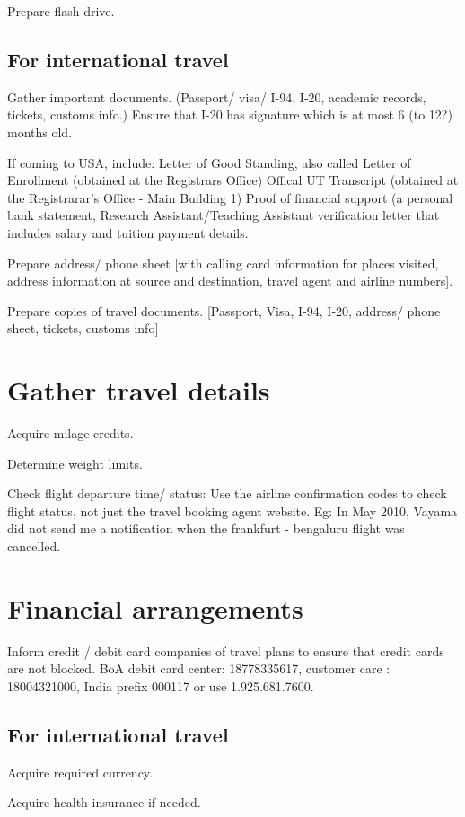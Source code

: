 \documentclass[oneside, article]{memoir}
\begin{document}
Prepare flash drive.

\subsection{For international travel}
Gather important documents. (Passport/ visa/ I-94, I-20, academic records, tickets, customs info.)
\subitem Ensure that I-20 has signature which is at most 6 (to 12?) months old.

If coming to USA, include:
\subitem Letter of Good Standing, also called Letter of Enrollment (obtained at the Registrars Office)
\subitem Offical UT Transcript (obtained at the Registrarar's Office - Main Building 1)
\subitem Proof of financial support (a personal bank statement, Research Assistant/Teaching Assistant verification letter that includes salary and tuition payment details.

Prepare address/ phone sheet [with calling card information for places visited, address information at source and destination, travel agent and airline numbers].

Prepare copies of travel documents. [Passport, Visa, I-94, I-20, address/ phone sheet, tickets, customs info]


\section{Gather travel details}
Acquire milage credits.

Determine weight limits.

Check flight departure time/ status: Use the airline confirmation codes to check flight status, not just the travel booking agent website. Eg: In May 2010, Vayama did not send me a notification when the frankfurt - bengaluru flight was cancelled.

\section{Financial arrangements}
Inform credit / debit card companies of travel plans to ensure that credit cards are not blocked.
\subitem BoA debit card center: 18778335617, customer care : 18004321000, India prefix 000117 or use 1.925.681.7600.

\subsection{For international travel}
Acquire required currency.

Acquire health insurance if needed.
\end{document}
